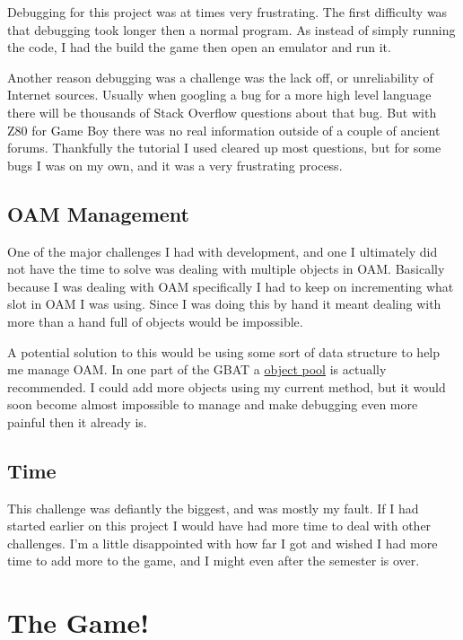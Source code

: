 \documentclass{article}
\begin{document}
Debugging for this project was at times very frustrating. The first difficulty was that debugging took longer then a normal program. As instead of simply running the code, I had the build the game then open an emulator and run it.

Another reason debugging was a challenge was the lack off, or unreliability of Internet sources. Usually when googling a bug for a more high level language there will be thousands of Stack Overflow questions about that bug. But with Z80 for Game Boy there was no real information outside of a couple of ancient forums. Thankfully the tutorial I used cleared up most questions, but for some bugs I was on my own, and it was a very frustrating process. 

\subsection{OAM Management}

One of the major challenges I had with development, and one I ultimately did not have the time to solve was dealing with multiple objects in OAM. Basically because I was dealing with OAM specifically I had to keep on incrementing what slot in OAM I was using. Since I was doing this by hand it meant dealing with more than a hand full of objects would be impossible. 

A potential solution to this would be using some sort of data structure to help me manage OAM. In one part of the GBAT a \href{https://gbdev.io/gb-asm-tutorial/part3/object-pools.html}{object pool} is actually recommended. I could add more objects using my current method, but it would soon become almost impossible to manage and make debugging even more painful then it already is. 

\subsection{Time}

This challenge was defiantly the biggest, and was mostly my fault. If I had started earlier on this project I would have had more time to deal with other challenges. I'm a little disappointed with how far I got and wished I had more time to add more to the game, and I might even after the semester is over.

\section{The Game!}
\end{document}
